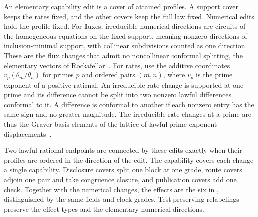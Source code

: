An elementary capability edit is a cover of attained profiles.
A support cover keeps the rates fixed, and the other covers keep
the full law fixed. Numerical edits hold the profile fixed. For
fluxes, irreducible numerical directions are circuits of the
homogeneous equations on the fixed support, meaning nonzero
directions of inclusion-minimal support, with collinear
subdivisions counted as one direction. These are the flux changes
that admit no noncollinear conformal splitting, the elementary vectors
of Rockafellar~\citep{rockafellar}. For rates, use
the additive coordinates
\(v_p(\theta_m/\theta_n)\) for primes \(p\) and ordered pairs
\((m,n)\), where \(v_p\) is the prime exponent of a positive
rational. An irreducible rate change is supported at one prime and
its difference cannot be split into two nonzero lawful differences
conformal to it. A difference is conformal to another if each
nonzero entry has the same sign and no greater magnitude. The
irreducible rate changes at a prime are thus the Graver basis
elements of the lattice of lawful prime-exponent displacements~\citep{graver}.

\begin{theorem}\label{thm:fixed-normal-form}
Two lawful rational endpoints are connected by these edits exactly
when their profiles are ordered in the direction of the edit.
The capability covers each change a single capability. Disclosure
covers split one block at one grade, route covers adjoin one pair
and take congruence closure, and publication covers add one check.
Together with the numerical changes, the effects are the six
in , distinguished by the same fields and clock
grades. Test-preserving relabelings preserve the effect types and
the elementary numerical directions.
\end{theorem}

